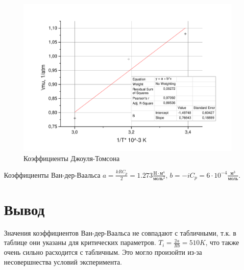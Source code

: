 \documentclass[a4paper,12pt]{article}
\begin{document}
\begin{figure}[H]
	\includegraphics[width = 0.6\linewidth]{mu}
	\caption{Коэффициенты Джоуля-Томсона}
\end{figure}

Коэффициенты Ван-дер-Ваальса $a = \frac{k R C_p}{2} = 1.273 \frac{\text{Н}\cdot\text{м}^4}{\text{моль}^2}$,  $b = -iC_p  =6 \cdot 10^{-4} \frac{\text{м}^3}{\text{моль}}$.


\section{Вывод}
Значения коэффициентов Ван-дер-Ваальса не совпадают с табличными, т.к. в таблице они указаны для критических параметров.
$T_i = \frac{2a}{Rb} = 510 K$, что также очень сильно расходится с табличным. Это могло произойти из-за несовершнества условий эксперимента.
\end{document}
